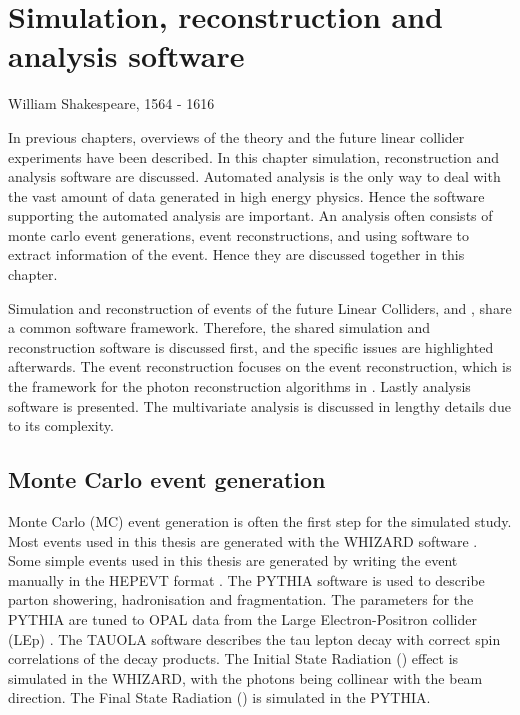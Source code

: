 \chapter{Simulation, reconstruction and analysis software}
\label{chap:Reconstruction}

%
{William Shakespeare, 1564 - 1616}%


In previous chapters, overviews of the theory and the future linear collider experiments have been described. In this chapter simulation, reconstruction and analysis software are discussed. Automated analysis is the only way to deal with the vast amount of data generated in high energy physics. Hence the software supporting the automated analysis are important. An analysis often consists of  monte carlo event generations, event reconstructions, and using software to extract information of the event. Hence they are discussed together in this chapter.

Simulation and reconstruction of events of the future Linear Colliders, \ILC and \CLIC, share a  common software framework.  Therefore,  the shared simulation and  reconstruction software is discussed first, and the \CLIC specific issues are highlighted afterwards. The event reconstruction focuses on the \pandora event reconstruction, which is the framework for the photon reconstruction algorithms in . Lastly analysis software is presented.   The multivariate analysis  is discussed  in lengthy details due to its complexity.

\section{Monte Carlo event generation}
\label{sec:pandoraMC}
Monte Carlo (MC) event generation is often the first step for the simulated study. Most events used in this thesis are generated with the WHIZARD software \cite{whizard,Moretti:2001zz}. Some simple events used in this thesis are generated by writing the event manually in the  HEPEVT format \cite{Altarelli:1989hx}. The PYTHIA software \cite{Sjostrand:1995iq} is used to describe parton showering, hadronisation and fragmentation. The parameters for the PYTHIA are tuned to OPAL data from the Large Electron-Positron collider (LEp) \cite{Alexander:1995bk}. The TAUOLA software \cite{Jadach:1993hs} describes the tau lepton decay with correct spin correlations of the decay products. The Initial State Radiation (\ISR) effect is simulated in the WHIZARD, with the \ISR photons being collinear with the beam direction. The Final State Radiation (\FSR) is simulated in the PYTHIA.


